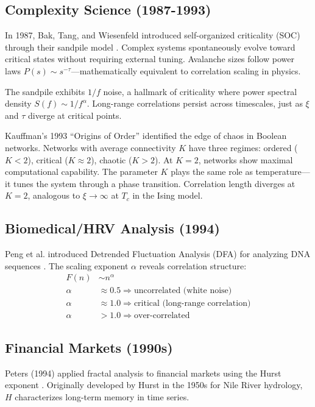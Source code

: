 \documentclass[11pt]{article}
\begin{document}
\subsection{Complexity Science (1987-1993)}

In 1987, Bak, Tang, and Wiesenfeld introduced self-organized criticality (SOC) through their sandpile model \cite{bak1987}. Complex systems spontaneously evolve toward critical states without requiring external tuning. Avalanche sizes follow power laws $P(s) \sim s^{-\tau}$---mathematically equivalent to correlation scaling in physics.

The sandpile exhibits $1/f$ noise, a hallmark of criticality where power spectral density $S(f) \sim 1/f^\alpha$. Long-range correlations persist across timescales, just as $\xi$ and $\tau$ diverge at critical points.

Kauffman's 1993 ``Origins of Order'' \cite{kauffman1993} identified the edge of chaos in Boolean networks. Networks with average connectivity $K$ have three regimes: ordered ($K < 2$), critical ($K \approx 2$), chaotic ($K > 2$). At $K = 2$, networks show maximal computational capability. The parameter $K$ plays the same role as temperature---it tunes the system through a phase transition. Correlation length diverges at $K = 2$, analogous to $\xi \to \infty$ at $T_c$ in the Ising model.

\subsection{Biomedical/HRV Analysis (1994)}

Peng et al. introduced Detrended Fluctuation Analysis (DFA) for analyzing DNA sequences \cite{peng1994dna}. The scaling exponent $\alpha$ reveals correlation structure:
\begin{align}
F(n) &\sim n^\alpha \\
\alpha &\approx 0.5 \Longrightarrow \text{uncorrelated (white noise)} \\
\alpha &\approx 1.0 \Longrightarrow \text{critical (long-range correlation)} \\
\alpha &> 1.0 \Longrightarrow \text{over-correlated}
\end{align}

\subsection{Financial Markets (1990s)}

Peters (1994) applied fractal analysis to financial markets using the Hurst exponent \cite{peters1994}. Originally developed by Hurst in the 1950s \cite{hurst1951} for Nile River hydrology, $H$ characterizes long-term memory in time series.
\end{document}
